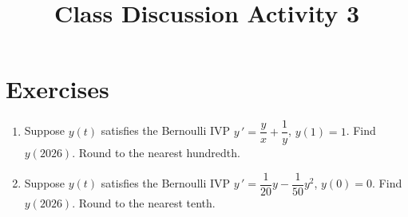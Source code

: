 \documentclass{ximera}
\begin{document}
\begin{abstract}
 \end{abstract}

    \title{Class Discussion Activity 3}
    
    \maketitle

\section*{Exercises}

\begin{enumerate}[label=(\arabic*)]



\item  Suppose $y(t)$ satisfies the Bernoulli IVP $y\,'=\dfrac{y}{x}+\dfrac{1}{y}$, $y(1)=1$.  Find $y(2026)$.  Round to the nearest hundredth.






\item Suppose $y(t)$ satisfies the Bernoulli IVP $y\,'=\dfrac{1}{20}y-\dfrac{1}{50}y^2$, $y(0)=0$.  Find $y(2026)$.  Round to the nearest tenth.












\end{enumerate}
\end{document}
